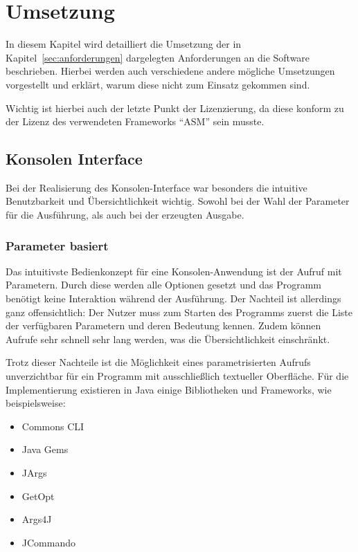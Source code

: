 
\chapter{Umsetzung}

In diesem Kapitel wird detailliert die Umsetzung der in Kapitel~\ref{sec:anforderungen} dargelegten Anforderungen an die Software beschrieben. Hierbei werden auch verschiedene andere mögliche Umsetzungen vorgestellt und erklärt, warum diese nicht zum Einsatz gekommen sind.

Wichtig ist hierbei auch der letzte Punkt der Lizenzierung, da diese konform zu der Lizenz des verwendeten Frameworks "`ASM"' sein musste.

\section{Konsolen Interface}
\label{sec:console}

Bei der Realisierung des Konsolen-Interface war besonders die intuitive Benutzbarkeit und Übersichtlichkeit wichtig. Sowohl bei der Wahl der Parameter für die Ausführung, als auch bei der erzeugten Ausgabe.

\subsection{Parameter basiert}

Das intuitivste Bedienkonzept für eine Konsolen-Anwendung ist der Aufruf mit Parametern. Durch diese werden alle Optionen gesetzt und das Programm benötigt keine Interaktion während der Ausführung. Der Nachteil ist allerdings ganz offensichtlich: Der Nutzer muss zum Starten des Programms zuerst die Liste der verfügbaren Parametern und deren Bedeutung kennen. Zudem können Aufrufe sehr schnell sehr lang werden, was die Übersichtlichkeit einschränkt.

Trotz dieser Nachteile ist die Möglichkeit eines parametrisierten Aufrufs unverzichtbar für ein Programm mit ausschließlich textueller Oberfläche. Für die Implementierung existieren in Java einige Bibliotheken und Frameworks, wie beispielsweise:
\begin{itemize}
	\item Commons CLI
	\item Java Gems
	\item JArgs
	\item GetOpt
	\item Args4J
	\item JCommando
\end{itemize}

